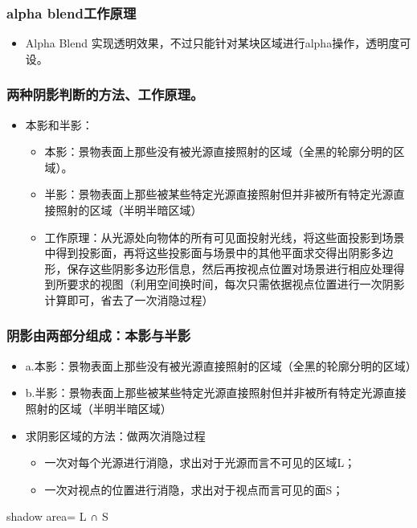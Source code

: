 \documentclass[9pt, b5paper]{article}
\begin{document}
\subsubsection{alpha blend工作原理}
\label{sec:org2bfc62e}
\begin{itemize}
\item Alpha Blend 实现透明效果，不过只能针对某块区域进行alpha操作，透明度可设。
\end{itemize}
\subsubsection{两种阴影判断的方法、工作原理。}
\label{sec:org5e592d3}
\begin{itemize}
\item 本影和半影：
\begin{itemize}
\item 本影：景物表面上那些没有被光源直接照射的区域（全黑的轮廓分明的区域）。
\item 半影：景物表面上那些被某些特定光源直接照射但并非被所有特定光源直接照射的区域（半明半暗区域）
\item 工作原理：从光源处向物体的所有可见面投射光线，将这些面投影到场景中得到投影面，再将这些投影面与场景中的其他平面求交得出阴影多边形，保存这些阴影多边形信息，然后再按视点位置对场景进行相应处理得到所要求的视图（利用空间换时间，每次只需依据视点位置进行一次阴影计算即可，省去了一次消隐过程）
\end{itemize}
\end{itemize}
\subsubsection{阴影由两部分组成：本影与半影}
\label{sec:org9d1630d}
\begin{itemize}
\item a.本影：景物表面上那些没有被光源直接照射的区域（全黑的轮廓分明的区域）
\item b.半影：景物表面上那些被某些特定光源直接照射但并非被所有特定光源直接照射的区域（半明半暗区域）
\item 求阴影区域的方法：做两次消隐过程
\begin{itemize}
\item 一次对每个光源进行消隐，求出对于光源而言不可见的区域L；
\item 一次对视点的位置进行消隐，求出对于视点而言可见的面S；
\end{itemize}
\end{itemize}
shadow area= L ∩ S
\end{document}
